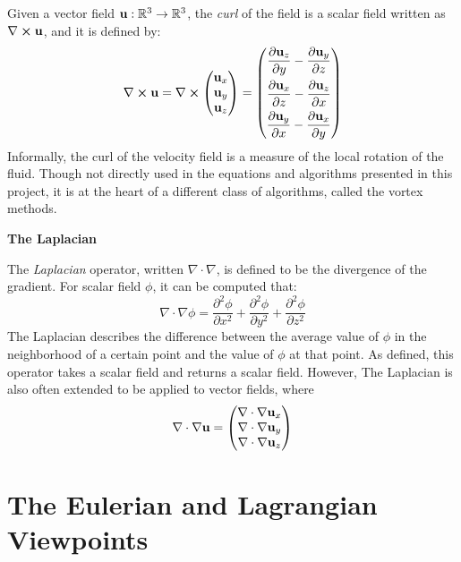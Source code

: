 Given a vector field $\textbf{u} : \mathbb{R} ^3 \rightarrow \mathbb{R} ^3$, the \textit{curl} of the field is a scalar field written as $\nabla \cross \textbf{u}$, and it is defined by:
$$
    \nabla \cross \textbf{u} = 
    \nabla \cross \begin{pmatrix}
        \textbf{u}_x \\
        \textbf{u}_y \\
        \textbf{u}_z
    \end{pmatrix}
    =
    \left(
    \begin{aligned}
        \frac{\partial \textbf{u}_z}{\partial y} - 
            \frac{\partial \textbf{u}_y}{\partial z} \\
        \frac{\partial \textbf{u}_x}{\partial z} - 
            \frac{\partial \textbf{u}_z}{\partial x} \\
        \frac{\partial \textbf{u}_y}{\partial x} - 
            \frac{\partial \textbf{u}_x}{\partial y} \\
    \end{aligned} \right)
$$
Informally, the curl of the velocity field is a measure of the local rotation of the fluid. Though not directly used in the equations and algorithms presented in this project, it is at the heart of a different class of algorithms, called the vortex methods\cite{angelidis2005simulation}.


\gapM

\textbf{The Laplacian}

\gapS

The \textit{Laplacian} operator, written $\nabla \cdot \nabla$, is defined to be the divergence of the gradient. For scalar field $\phi$, it can be computed that:
$$
\nabla \cdot \nabla \phi = 
\frac{\partial ^2 \phi}{\partial x^2}+
\frac{\partial ^2 \phi}{\partial y^2}+
\frac{\partial ^2 \phi}{\partial z^2}
$$
The Laplacian describes the difference between the average value of $\phi$ in the neighborhood of a certain point and the value of $\phi$ at that point. As defined, this operator takes a scalar field and returns a scalar field. However, The Laplacian is also often extended to be applied to vector fields, where 
$$
\nabla \cdot \nabla \textbf{u} =
    \begin{pmatrix}
        \nabla \cdot \nabla \textbf{u}_x \\
        \nabla \cdot \nabla \textbf{u}_y \\
        \nabla \cdot \nabla \textbf{u}_z
    \end{pmatrix}
$$


\section{The Eulerian and Lagrangian Viewpoints}

